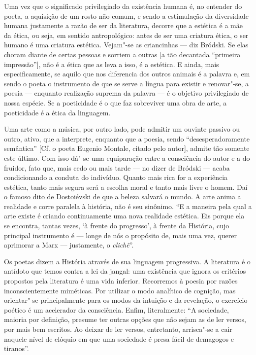 Uma vez que o significado privilegiado da existência humana é, no
entender do poeta, a aquisição de um rosto não comum, e sendo a
estimulação da diversidade humana justamente a razão de ser da
literatura, decorre que a estética é a mãe da ética, ou seja, em sentido
antropológico: antes de ser uma criatura ética, o ser humano é uma
criatura estética. Vejam"-se as criancinhas --- diz Bródski. Se elas
choram diante de certas pessoas e sorriem a outras {[}a tão decantada
``primeira impressão''{]}, não é a ética que as leva a isso, é a
estética. E ainda, mais especificamente, se aquilo que nos diferencia
dos outros animais é a palavra e, em sendo o poeta o instrumento de que se
serve a língua para existir e renovar"-se, a poesia --- enquanto
realização suprema da palavra --- é o objetivo privilegiado de nossa
espécie. Se a poeticidade é o que faz sobreviver uma obra de arte, a
poeticidade é a ética da linguagem.

Uma arte como a música, por outro lado, pode admitir um ouvinte passivo
ou outro, ativo, que a interprete, enquanto que a poesia, sendo
``desesperadoramente semântica'' {[}Cf. o poeta Eugenio Montale, citado
pelo autor{]}, admite tão somente este último. Com isso dá"-se uma
equiparação entre a consciência do autor e a do fruidor, fato que, mais
cedo ou mais tarde --- no dizer de Bródski --- acaba condicionando a
conduta do indivíduo. Quanto mais rica for a experiência estética, tanto
mais segura será a escolha moral e tanto mais livre o homem. Daí o
famoso dito de Dostoiévski de que a beleza salvará o mundo. A arte anima
a realidade e corre paralela à história, não é seu sinônimo. ``E a
maneira pela qual a arte existe é criando continuamente uma nova
realidade estética. Eis porque ela se encontra, tantas vezes, `à frente
do progresso', à frente da História, cujo principal instrumento é ---
longe de nós o propósito de, mais uma vez, querer aprimorar a Marx ---
justamente, o \emph{clichê}''.

Os poetas dizem a História através de sua linguagem progressiva. A
literatura é o antídoto que temos contra a lei da jangal: uma existência
que ignora os critérios propostos pela literatura é uma vida inferior.
Recorremos à poesia por razões inconscientemente miméticas. Por utilizar
o modo analítico de cognição, mas orientar"-se principalmente para os
modos da intuição e da revelação, o exercício poético é um acelerador da
consciência. Enfim, literalmente: ``A sociedade, maioria por definição,
presume ter outras opções que não sejam as de ler versos, por mais bem
escritos. Ao deixar de ler versos, entretanto, arrisca"-se a cair naquele
nível de elóquio em que uma sociedade é presa fácil de demagogos e
tiranos''.

